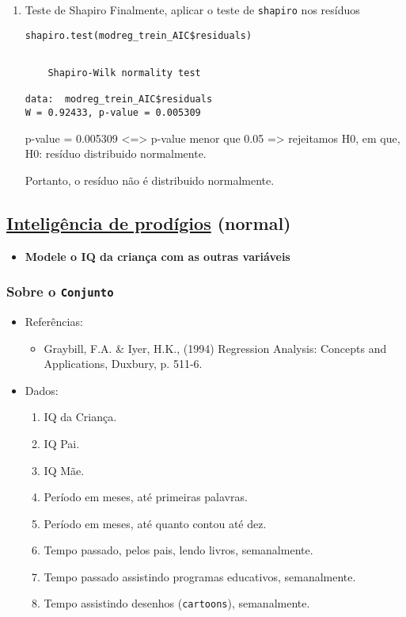 \documentclass[11pt]{article}
\begin{document}
\begin{enumerate}
\item Teste de Shapiro
\label{sec:orgaf29295}
Finalmente, aplicar o teste de \texttt{shapiro} nos resíduos

\begin{verbatim}
shapiro.test(modreg_trein_AIC$residuals)
\end{verbatim}

\begin{verbatim}

	Shapiro-Wilk normality test

data:  modreg_trein_AIC$residuals
W = 0.92433, p-value = 0.005309

\end{verbatim}


p-value = 0.005309 <=> p-value menor que 0.05 => rejeitamos H0, em que, H0: resíduo distribuido normalmente.

Portanto, o resíduo não é distribuido normalmente.
\end{enumerate}

\subsection{\href{https://www.openintro.org/data/index.php?data=gifted}{Inteligência de prodígios} (normal)}
\label{sec:orgc439301}
\begin{itemize}
\item \textbf{Modele o IQ da criança com as outras variáveis}
\end{itemize}
\subsubsection{Sobre o \texttt{Conjunto}}
\label{sec:org9315136}
\begin{itemize}
\item Referências:
\begin{itemize}
\item Graybill, F.A. \& Iyer, H.K., (1994) Regression Analysis: Concepts and Applications, Duxbury, p. 511-6.
\end{itemize}
\item Dados:
\begin{enumerate}
\item IQ da Criança.
\item IQ Pai.
\item IQ Mãe.
\item Período em meses, até primeiras palavras.
\item Período em meses, até quanto contou até dez.
\item Tempo passado, pelos pais, lendo livros, semanalmente.
\item Tempo passado assistindo programas educativos, semanalmente.
\item Tempo assistindo desenhos (\texttt{cartoons}), semanalmente.
\end{enumerate}
\end{itemize}
\end{document}
